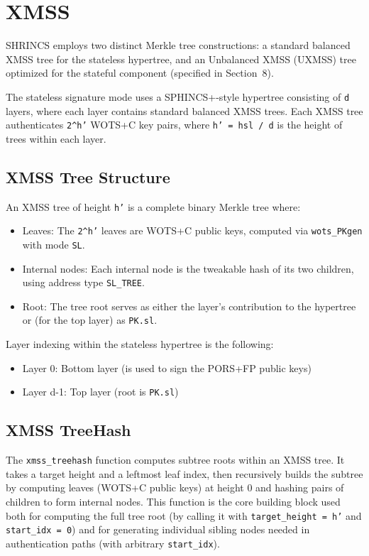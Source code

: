 \section{XMSS}
SHRINCS employs two distinct Merkle tree constructions: a standard balanced XMSS tree for the stateless hypertree, and an Unbalanced XMSS (UXMSS) tree optimized for the stateful component (specified in Section~8).

The stateless signature mode uses a SPHINCS+-style hypertree consisting of \texttt{d} layers, where each layer contains standard balanced XMSS trees. Each XMSS tree authenticates \texttt{2\string^h'} WOTS+C key pairs, where \texttt{h' = hsl / d} is the height of trees within each layer.

\subsection{XMSS Tree Structure}
An XMSS tree of height \texttt{h'} is a complete binary Merkle tree where:
\begin{itemize}
    \item Leaves: The \texttt{2\string^h'} leaves are WOTS+C public keys, computed via \texttt{wots\_PKgen} with mode \texttt{SL}.
    \item Internal nodes: Each internal node is the tweakable hash of its two children, using address type \texttt{SL\_TREE}.
    \item Root: The tree root serves as either the layer's contribution to the hypertree or (for the top layer) as \texttt{PK.sl}.
\end{itemize}

Layer indexing within the stateless hypertree is the following:
\begin{itemize}
    \item Layer 0: Bottom layer (is used to sign the PORS+FP public keys)
    \item Layer d-1: Top layer (root is \texttt{PK.sl})
\end{itemize}

\subsection{XMSS TreeHash}
The \texttt{xmss\_treehash} function computes subtree roots within an XMSS tree. It takes a target height and a leftmost leaf index, then recursively builds the subtree by computing leaves (WOTS+C public keys) at height 0 and hashing pairs of children to form internal nodes. This function is the core building block used both for computing the full tree root (by calling it with \texttt{target\_height = h'} and \texttt{start\_idx = 0}) and for generating individual sibling nodes needed in authentication paths (with arbitrary \texttt{start\_idx}).

